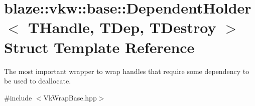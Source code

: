 \hypertarget{structblaze_1_1vkw_1_1base_1_1DependentHolder}{}\section{blaze\+:\+:vkw\+:\+:base\+:\+:Dependent\+Holder$<$ T\+Handle, T\+Dep, T\+Destroy $>$ Struct Template Reference}
\label{structblaze_1_1vkw_1_1base_1_1DependentHolder}


The most important wrapper to wrap handles that require some dependency to be used to deallocate.  




{\ttfamily \#include $<$Vk\+Wrap\+Base.\+hpp$>$}

